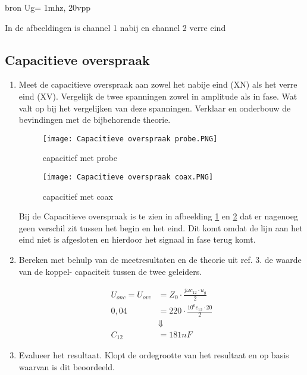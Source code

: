 bron Ug= 1mhz, 20vpp

In de afbeeldingen is channel 1 nabij en channel 2 verre eind

\subsection{Capacitieve overspraak}
\begin{enumerate}
    \item Meet de capacitieve overspraak aan zowel het nabije eind (XN) als het verre eind (XV).
    Vergelijk de twee spanningen zowel in amplitude als in fase. Wat valt op bij het vergelijken
    van deze spanningen. Verklaar en onderbouw de bevindingen met de bijbehorende theorie.

    \begin{figure}[H]
        \centering
        \texttt{[image: Capacitieve overspraak probe.PNG]}
        \caption{capacitief met probe}
        \label{fig:capacitief met probe}
    \end{figure}

    \begin{figure}[H]
        \centering
        \texttt{[image: Capacitieve overspraak coax.PNG]}
        \caption{capacitief met coax}
        \label{fig:capacitief met coax}
    \end{figure}

    Bij de Capacitieve overspraak is te zien in afbeelding \ref{fig:capacitief met probe} en \ref{fig:capacitief met coax} dat er nagenoeg geen verschil zit tussen het begin en het eind. Dit komt omdat de lijn aan het eind niet is afgesloten en hierdoor het signaal in fase terug komt.


    \item  Bereken met behulp van de meetresultaten en de theorie uit ref. 3. de waarde van de koppel- capaciteit tussen de twee geleiders.
    
    \begin{equation}
        \begin{split}
            U_{onc} = U_{ovc} &= Z_{0} \cdot \frac{j \omega c_{12} \cdot u_{g}}{2}\\
            0,04 &= 220 \cdot \frac{10^6 c_{12} \cdot 20}{2}\\
            &\Downarrow \\
            C_{12} &= 181 nF
        \end{split}
    \end{equation}

    \item Evalueer het resultaat. Klopt de ordegrootte van het resultaat en op basis waarvan is dit beoordeeld.
\end{enumerate}

